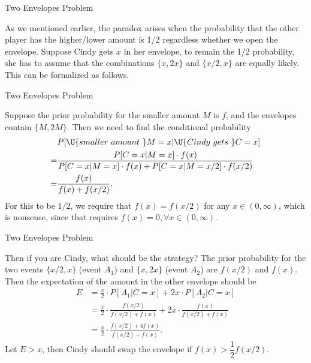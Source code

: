 \begin{frame}{Two Envelopes Problem}

\justifying
{} As we mentioned earlier, the paradox arises when the probability that the other player has the higher/lower amount is 1/2 regardless whether we open the envelope. Suppose Cindy gets $x$ in her envelope, to remain the 1/2 probability, she has to assume that the combinations $\{x, 2x\}$ and $\{x/2, x\}$ are equally likely. This can be formalized as follows.

\end{frame}

\begin{frame}{Two Envelopes Problem}

\justifying
{} Suppose the prior probability for the smaller amount $M$ is $f$, and the envelopes contain $\{M, 2M\}$. Then we need to find the conditional probability
\begin{align*}
& P[\U{smaller\ amount\ } M = x|\U{Cindy\ gets\ } C = x] \\
= & \frac{P[C = x|M = x] \cdot f(x)}{P[C = x|M = x]\cdot f(x) + P[C = x|M = x/2]\cdot f(x/2)} \\
= & \frac{f(x)}{f(x) + f(x/2)}.
\end{align*}
For this to be $1/2$, we require that $f(x) = f(x/2)$ for any $x\in (0, \infty)$, which is nonsense, since that requires $f(x) = 0, \forall x\in (0, \infty)$.

\end{frame}

\begin{frame}{Two Envelopes Problem}

\justifying
{} Then if you are Cindy, what should be the strategy? The prior probability for the two events $\{x/2, x\}$ (event $A_1$) and $\{x, 2x\}$ (event $A_2$) are $f(x/2)$ and $f(x)$. Then the expectation of the amount in the other envelope should be
\begin{align*}
E & = \frac{x}{2}\cdot P[A_1|C = x] + 2x\cdot P[A_2|C = x] \\
& = \frac{x}{2} \cdot \frac{f(x/2)}{f(x/2) + f(x)} + 2x \cdot \frac{f(x)}{f(x/2) + f(x)} \\
& = \frac{x}{2}\cdot \frac{f(x/2) + 4f(x)}{f(x/2) + f(x)}.
\end{align*}
Let $E > x$, then Cindy should swap the envelope if $f(x) > \dfrac{1}{2}f(x/2)$.

\end{frame}

